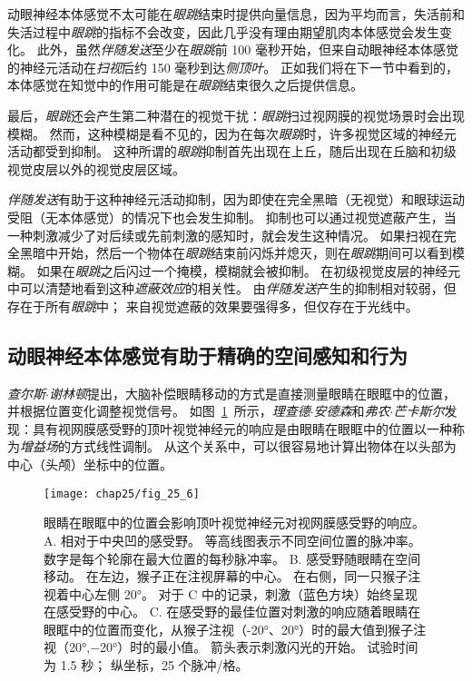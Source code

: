 动眼神经本体感觉不太可能在\textit{眼跳}结束时提供向量信息，因为平均而言，失活前和失活过程中\textit{眼跳}的指标不会改变，因此几乎没有理由期望肌肉本体感觉会发生变化。
此外，虽然\textit{伴随发送}至少在\textit{眼跳}前 100 毫秒开始，但来自动眼神经本体感觉的神经元活动在\textit{扫视}后约 150 毫秒到达\textit{侧顶叶}。
正如我们将在下一节中看到的，本体感觉在知觉中的作用可能是在\textit{眼跳}结束很久之后提供信息。


最后，\textit{眼跳}还会产生第二种潜在的视觉干扰：\textit{眼跳}扫过视网膜的视觉场景时会出现模糊。
然而，这种模糊是看不见的，因为在每次\textit{眼跳}时，许多视觉区域的神经元活动都受到抑制。
这种所谓的\textit{眼跳}抑制首先出现在上丘，随后出现在丘脑和初级视觉皮层以外的视觉皮层区域。


\textit{伴随发送}有助于这种神经元活动抑制，因为即使在完全黑暗（无视觉）和眼球运动受阻（无本体感觉）的情况下也会发生抑制。
抑制也可以通过视觉遮蔽产生，当一种刺激减少了对后续或先前刺激的感知时，就会发生这种情况。
如果扫视在完全黑暗中开始，然后一个物体在\textit{眼跳}结束前闪烁并熄灭，则在\textit{眼跳}期间可以看到模糊。
如果在\textit{眼跳}之后闪过一个掩模，模糊就会被抑制。
在初级视觉皮层的神经元中可以清楚地看到这种\textit{遮蔽效应}的相关性。
由\textit{伴随发送}产生的抑制相对较弱，但存在于所有\textit{眼跳}中；
来自视觉遮蔽的效果要强得多，但仅存在于光线中。



\subsection{动眼神经本体感觉有助于精确的空间感知和行为}

\textit{查尔斯$\cdot$谢林顿}提出，大脑补偿眼睛移动的方式是直接测量眼睛在眼眶中的位置，并根据位置变化调整视觉信号。
如图~\ref{fig:25_6}~所示，\textit{理查德$\cdot$安德森}和\textit{弗农$\cdot$芒卡斯尔}发现：具有视网膜感受野的顶叶视觉神经元的响应是由眼睛在眼眶中的位置以一种称为\textit{增益场}的方式线性调制\cite{andersen1985encoding}。
从这个关系中，可以很容易地计算出物体在以头部为中心（头颅）坐标中的位置。


\begin{figure}[htbp]
	\centering
	\texttt{[image: chap25/fig\_25\_6]}
	\caption{眼睛在眼眶中的位置会影响顶叶视觉神经元对视网膜感受野的响应。
		A. 相对于中央凹的感受野。
		等高线图表示不同空间位置的脉冲率。
		数字是每个轮廓在最大位置的每秒脉冲率。
		B. 感受野随眼睛在空间移动。
		在左边，猴子正在注视屏幕的中心。
		在右侧，同一只猴子注视着中心左侧 20°。
		对于 C 中的记录，刺激（蓝色方块）始终呈现在感受野的中心。
		C. 在感受野的最佳位置对刺激的响应随着眼睛在眼眶中的位置而变化，从猴子注视（-20°、20°）时的最大值到猴子注视（20°,−20°）时的最小值。
		箭头表示刺激闪光的开始。
		试验时间为 1.5 秒；
		纵坐标，25 个脉冲/格\cite{andersen1985encoding}。}
	\label{fig:25_6}
\end{figure}


